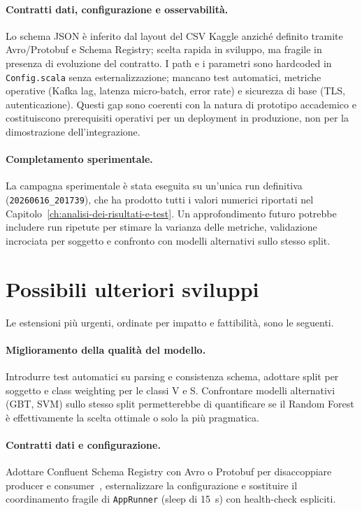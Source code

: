 \paragraph{Contratti dati, configurazione e osservabilità.}
Lo schema JSON è inferito dal layout del CSV Kaggle anziché definito tramite Avro/Protobuf e Schema Registry; scelta rapida in sviluppo, ma fragile in presenza di evoluzione del contratto.
I path e i parametri sono hardcoded in \texttt{Config.scala} senza esternalizzazione; mancano test automatici, metriche operative (Kafka lag, latenza micro-batch, error rate) e sicurezza di base (TLS, autenticazione).
Questi gap sono coerenti con la natura di prototipo accademico e costituiscono prerequisiti operativi per un deployment in produzione, non per la dimostrazione dell'integrazione.

\paragraph{Completamento sperimentale.}
La campagna sperimentale è stata eseguita su un'unica run definitiva (\texttt{20260616\_201739}), che ha prodotto tutti i valori numerici riportati nel Capitolo~\ref{ch:analisi-dei-risultati-e-test}.
Un approfondimento futuro potrebbe includere run ripetute per stimare la varianza delle metriche, validazione incrociata per soggetto e confronto con modelli alternativi sullo stesso split.

\section{Possibili ulteriori sviluppi}\label{sec:ulteriori-sviluppi}

Le estensioni più urgenti, ordinate per impatto e fattibilità, sono le seguenti.

\paragraph{Miglioramento della qualità del modello.}
Introdurre test automatici su parsing e consistenza schema, adottare split per soggetto e class weighting per le classi V e S.
Confrontare modelli alternativi (GBT, SVM) sullo stesso split permetterebbe di quantificare se il Random Forest è effettivamente la scelta ottimale o solo la più pragmatica.

\paragraph{Contratti dati e configurazione.}
Adottare Confluent Schema Registry con Avro o Protobuf per disaccoppiare producer e consumer~\cite{dehghani2022data}, esternalizzare la configurazione e sostituire il coordinamento fragile di \texttt{AppRunner} (sleep di 15~s) con health-check espliciti.

